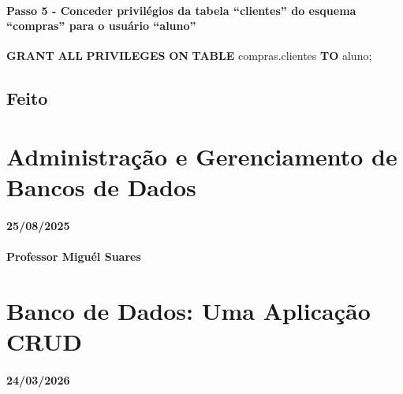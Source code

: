 \documentclass[
]{book}
\newenvironment{Shaded}{\begin{snugshade}}{\end{snugshade}}
\newcommand{\KeywordTok}[1]{\textcolor[rgb]{0.13,0.29,0.53}{\textbf{#1}}}
\newcommand{\NormalTok}[1]{#1}
\begin{document}
\subsubsection{Passo 5 - Conceder privilégios da tabela ``clientes'' do esquema ``compras'' para o usuário ``aluno''}\label{passo-5---conceder-priviluxe9gios-da-tabela-clientes-do-esquema-compras-para-o-usuuxe1rio-aluno}

\begin{Shaded}
\begin{Highlighting}[]
\KeywordTok{GRANT} \KeywordTok{ALL} \KeywordTok{PRIVILEGES} \KeywordTok{ON} \KeywordTok{TABLE}\NormalTok{ compras.clientes }\KeywordTok{TO}\NormalTok{ aluno;}
\end{Highlighting}
\end{Shaded}

\section{Feito}\label{feito}

\chapter{Administração e Gerenciamento de Bancos de Dados}\label{administrauxe7uxe3o-e-gerenciamento-de-bancos-de-dados-1}

\subsubsection*{25/08/2025}\label{section-4}

\subsubsection*{Professor Miguél Suares}\label{professor-miguuxe9l-suares-4}

\chapter{Banco de Dados: Uma Aplicação CRUD}\label{banco-de-dados-uma-aplicauxe7uxe3o-crud}

\subsubsection*{24/03/2026}\label{section-5}
\end{document}
